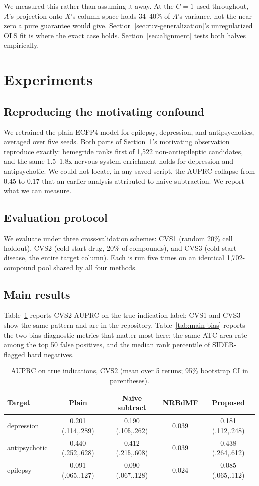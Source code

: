 \documentclass{llncs}
\begin{document}
We measured this rather than assuming it away. At the $C=1$ used throughout, $A$'s projection onto $X$'s column space holds 34--40\% of $A$'s variance, not the near-zero a pure guarantee would give. Section~\ref{sec:ruv-generalization}'s unregularized OLS fit is where the exact case holds. Section~\ref{sec:alignment} tests both halves empirically.

\section{Experiments}
\label{sec:experiments}

\subsection{Reproducing the motivating confound}
\label{sec:intro-confound}
We retrained the plain ECFP4 model for epilepsy, depression, and antipsychotics, averaged over five seeds. Both parts of Section~1's motivating observation reproduce exactly: bemegride ranks first of 1{,}522 non-antiepileptic candidates, and the same 1.5--1.8x nervous-system enrichment holds for depression and antipsychotic. We could not locate, in any saved script, the AUPRC collapse from 0.45 to 0.17 that an earlier analysis attributed to naive subtraction. We report what we can measure.

\subsection{Evaluation protocol}
We evaluate under three cross-validation schemes: CVS1 (random 20\% cell holdout), CVS2 (cold-start-drug, 20\% of compounds), and CVS3 (cold-start-disease, the entire target column). Each is run five times on an identical 1{,}702-compound pool shared by all four methods.

\subsection{Main results}
Table~\ref{tab:main-auprc} reports CVS2 AUPRC on the true indication label; CVS1 and CVS3 show the same pattern and are in the repository. Table~\ref{tab:main-bias} reports the two bias-diagnostic metrics that matter most here: the same-ATC-area rate among the top 50 false positives, and the median rank percentile of SIDER-flagged hard negatives.

\begin{table}[t]
\centering
\small
\caption{AUPRC on true indications, CVS2 (mean over 5 reruns; 95\% bootstrap CI in parentheses).}
\label{tab:main-auprc}
\begin{tabular}{lcccc}
\toprule
Target & Plain & Naive subtract & NRBdMF & Proposed \\
\midrule
depression & 0.201 (.114,.289) & 0.190 (.105,.262) & 0.039 & 0.181 (.112,.248) \\
antipsychotic & 0.440 (.252,.628) & 0.412 (.215,.608) & 0.039 & 0.438 (.264,.612) \\
epilepsy & 0.091 (.065,.127) & 0.090 (.067,.128) & 0.024 & 0.085 (.065,.112) \\
\bottomrule
\end{tabular}
\end{table}
\end{document}

